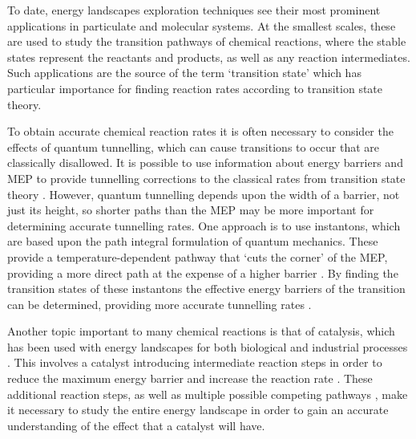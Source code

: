 To date, energy landscapes exploration techniques see their most prominent applications in particulate and molecular systems.
At the smallest scales, these are used to study the transition pathways of chemical reactions, where the stable states represent the reactants and products, as well as any reaction intermediates.
Such applications are the source of the term `transition state' which has particular importance for finding reaction rates according to transition state theory.

To obtain accurate chemical reaction rates it is often necessary to consider the effects of quantum tunnelling, which can cause transitions to occur that are classically disallowed.
It is possible to use information about energy barriers and MEP to provide tunnelling corrections to the classical rates from transition state theory \cite{Truhlar1971,Miller1979}.
However, quantum tunnelling depends upon the width of a barrier, not just its height, so shorter paths than the MEP may be more important for determining accurate tunnelling rates.
One approach is to use instantons, which are based upon the path integral formulation of quantum mechanics.
These provide a temperature-dependent pathway that `cuts the corner' of the MEP, providing a more direct path at the expense of a higher barrier \cite{Richardson2016,Richardson2018}.
By finding the transition states of these instantons the effective energy barriers of the transition can be determined, providing more accurate tunnelling rates \cite{Vaillant2019}.

Another topic important to many chemical reactions is that of catalysis, which has been used with energy landscapes for both biological and industrial processes \cite{Boehr2006,Benkovic2008,Kerns2015,Guo2018a}.
This involves a catalyst introducing intermediate reaction steps in order to reduce the maximum energy barrier and increase the reaction rate \cite{Kerns2015}.
These additional reaction steps, as well as multiple possible competing pathways \cite{Benkovic2008}, make it necessary to study the entire energy landscape in order to gain an accurate understanding of the effect that a catalyst will have.

